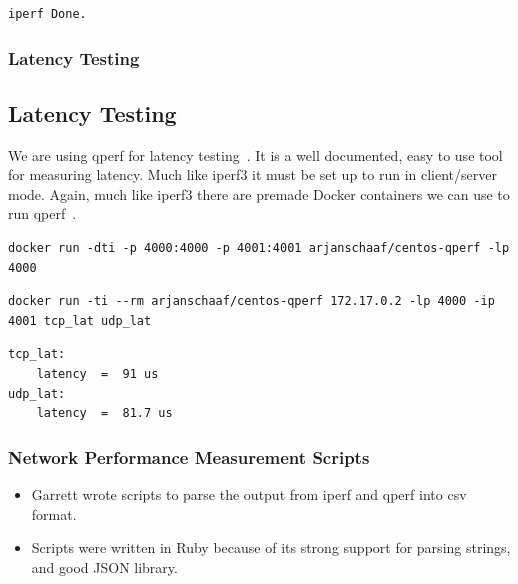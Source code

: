 \documentclass[pdf]{beamer}
\begin{document}
\begin{frame}
\begin{lstlisting}[caption = iperf3 output, basicstyle=\small]
iperf Done.
	\end{lstlisting}

\end{frame}

\begin{frame}
	\frametitle{Latency Testing}
	\subsection{Latency Testing}
	We are using qperf for latency testing~\cite{qperf}.
	It is a well documented, easy to use tool for measuring latency.
	Much like iperf3 it must be set up to run in client/server mode.
	Again, much like iperf3 there are premade Docker containers we can use to run 
	qperf~\cite{qperfdocker}.

	\begin{lstlisting}[caption = Running a qperf docker container in server mode]
docker run -dti -p 4000:4000 -p 4001:4001 arjanschaaf/centos-qperf -lp 4000
	\end{lstlisting}

	\begin{lstlisting}[caption = Running a qperf docker container in client mode to 
measure TCP and UDP latency]
docker run -ti --rm arjanschaaf/centos-qperf 172.17.0.2 -lp 4000 -ip 4001 tcp_lat udp_lat
	\end{lstlisting}

	\begin{lstlisting}[caption = qperf output]
tcp_lat:
    latency  =  91 us
udp_lat:
    latency  =  81.7 us
	\end{lstlisting}
\end{frame}

\begin{frame}
	\frametitle{Network Performance Measurement Scripts}
	\begin{itemize}
		\item Garrett wrote scripts to parse the output from iperf and qperf into csv format.
		\item Scripts were written in Ruby because of its strong support for parsing strings, and good JSON library.
	\end{itemize}
\end{frame}
\end{document}
